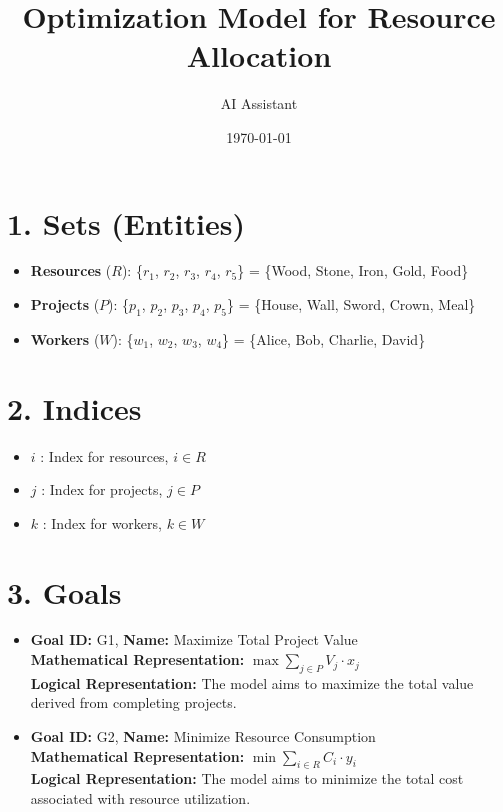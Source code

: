 \documentclass{article}
\title{Optimization Model for Resource Allocation}
\author{AI Assistant}
\date{\today}
\begin{document}
\maketitle

\tableofcontents

\section{1. Sets (Entities)}

\begin{itemize}
    \item \textbf{Resources} ($R$):  \{$r_1$, $r_2$, $r_3$, $r_4$, $r_5$\} = \{Wood, Stone, Iron, Gold, Food\}
    \item \textbf{Projects} ($P$): \{$p_1$, $p_2$, $p_3$, $p_4$, $p_5$\} = \{House, Wall, Sword, Crown, Meal\}
    \item \textbf{Workers} ($W$): \{$w_1$, $w_2$, $w_3$, $w_4$\} = \{Alice, Bob, Charlie, David\}
\end{itemize}

\section{2. Indices}

\begin{itemize}
    \item $i$ : Index for resources, $i \in R$
    \item $j$ : Index for projects, $j \in P$
    \item $k$ : Index for workers, $k \in W$
\end{itemize}

\section{3. Goals}

\begin{itemize}
    \item \textbf{Goal ID:} G1, \textbf{Name:} Maximize Total Project Value \\
    \textbf{Mathematical Representation:} $\max \sum_{j \in P} V_j \cdot x_j$ \\
    \textbf{Logical Representation:} The model aims to maximize the total value derived from completing projects.

    \item \textbf{Goal ID:} G2, \textbf{Name:} Minimize Resource Consumption \\
    \textbf{Mathematical Representation:} $\min \sum_{i \in R} C_i \cdot y_i$ \\
    \textbf{Logical Representation:} The model aims to minimize the total cost associated with resource utilization.
\end{itemize}
\end{document}

